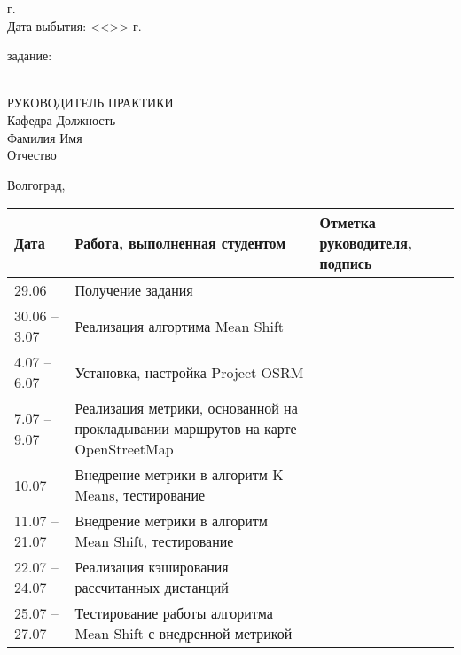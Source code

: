 \begin{titlepage}
\begin{flushleft}
        \the\year г.\\
        Дата выбытия: \hspace{3.1cm}<<\underline{\hspace{1cm}}>> \underline{\hspace{3cm}}
        \the\year г.
    \end{flushleft}
    \vspace{0.5cm}
     задание: \underline{\hspace{11.25cm}}\\
    \underline{\hspace{\textwidth}}\\
    \vspace{0.5cm}
    \begin{flushleft}
        РУКОВОДИТЕЛЬ ПРАКТИКИ\\
        Кафедра \underline{\hspace{5cm}} Должность \underline{\hspace{5cm}} \\
        Фамилия \underline{\hspace{5cm}} Имя \underline{\hspace{6.5cm}}\\
        Отчество \underline{\hspace{5cm}}
    \end{flushleft}
    \vspace{\fill}
    \begin{center}
        Волгоград, \the\year
    \end{center}
\end{titlepage}
\begin{table}[h!]
    \centering
    \begin{tabular}{|m{}|m{}|m{}|}
        \hline
        Дата & Работа, выполненная студентом & Отметка
        руководителя, подпись \\ \hline
        29.06 & Получение задания & \\ \hline
        30.06 -- 3.07 & Реализация алгортима Mean Shift & \\ \hline
        4.07 -- 6.07 & Установка, настройка Project OSRM & \\ \hline
        7.07 -- 9.07 & Реализация метрики, основанной на прокладывании маршрутов на
            карте OpenStreetMap & \\ \hline
        10.07 & Внедрение метрики в алгоритм K-Means, тестирование & \\ \hline
        11.07 -- 21.07 & Внедрение метрики в алгоритм Mean Shift, тестирование & \\ \hline
        22.07 -- 24.07 & Реализация кэширования рассчитанных дистанций & \\ \hline
        25.07 -- 27.07 & Тестирование работы алгоритма Mean Shift с внедренной метрикой & \\ \hline
    \end{tabular}
\end{table}
